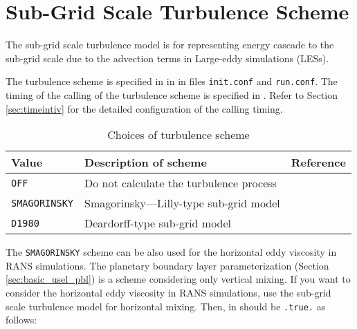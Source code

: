 
\section{Sub-Grid Scale Turbulence Scheme} \label{sec:basic_usel_turbulence}

The sub-grid scale turbulence model is for representing energy cascade to the sub-grid scale due to the advection terms in Large-eddy simulations (LESs).


The turbulence scheme is specified in  in  in files \verb|init.conf| and \verb|run.conf|. The timing of the calling of the turbulence scheme is specified in . Refer to Section \ref{sec:timeintiv} for the detailed configuration of the calling timing.

\begin{table}[h]
\begin{center}
  \caption{Choices of turbulence scheme}
  \label{tab:nml_atm_tb}
  \begin{tabularx}{150mm}{lXX} \hline
    \rowcolor[gray]{0.9}  Value & Description of scheme & Reference\\ \hline
      \verb|OFF|          & Do not calculate the turbulence process &  \\
      \verb|SMAGORINSKY|  & Smagorinsky—Lilly-type sub-grid model & \citet{smagorinsky_1963,lilly_1962,Brown_etal_1994,Scotti_1993} \\
      \verb|D1980|        & Deardorff-type sub-grid model & \citet{Deardorff_1980} \\
    \hline
  \end{tabularx}
\end{center}
\end{table}

The \verb|SMAGORINSKY| scheme can be also used for the horizontal eddy viscosity in RANS simulations.
The planetary boundary layer parameterization (Section \ref{sec:basic_usel_pbl}) is a scheme considering only vertical mixing.
If you want to consider the horizontal eddy viscosity in RANS simulations,
use the sub-grid scale turbulence model for horizontal mixing.
Then,  in  should be \verb|.true.| as follows:
